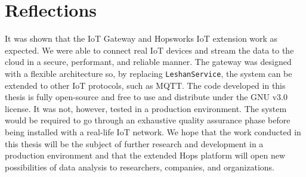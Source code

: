 \section{Reflections}
It was shown that the IoT Gateway and Hopsworks IoT extension work as expected.
We were able to connect real IoT devices and stream the data to the cloud in a secure, performant, and reliable manner.
The gateway was designed with a flexible architecture so, by replacing \texttt{LeshanService}, the system can be extended to other IoT protocols, such as MQTT.
The code developed in this thesis is fully open-source and free to use and distribute under the GNU v3.0 license.
It was not, however, tested in a production environment. 
The system would be required to go through an exhaustive quality assurance phase before being installed with a real-life IoT network.
We hope that the work conducted in this thesis will be the subject of further research and development in a production environment and that the extended Hops platform will open new possibilities of data analysis to researchers, companies, and organizations.
